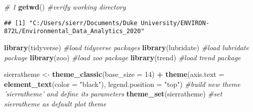 \documentclass[
]{article}
\newenvironment{Shaded}{\begin{snugshade}}{\end{snugshade}}
\newcommand{\CommentTok}[1]{\textcolor[rgb]{0.56,0.35,0.01}{\textit{#1}}}
\newcommand{\DataTypeTok}[1]{\textcolor[rgb]{0.13,0.29,0.53}{#1}}
\newcommand{\DecValTok}[1]{\textcolor[rgb]{0.00,0.00,0.81}{#1}}
\newcommand{\KeywordTok}[1]{\textcolor[rgb]{0.13,0.29,0.53}{\textbf{#1}}}
\newcommand{\NormalTok}[1]{#1}
\newcommand{\OperatorTok}[1]{\textcolor[rgb]{0.81,0.36,0.00}{\textbf{#1}}}
\newcommand{\StringTok}[1]{\textcolor[rgb]{0.31,0.60,0.02}{#1}}
\begin{document}
\begin{Shaded}
\begin{Highlighting}[]
\CommentTok{# 1 }
\KeywordTok{getwd}\NormalTok{() }\CommentTok{#verify working directory}
\end{Highlighting}
\end{Shaded}

\begin{verbatim}
## [1] "C:/Users/sierr/Documents/Duke University/ENVIRON-872L/Environmental_Data_Analytics_2020"
\end{verbatim}

\begin{Shaded}
\begin{Highlighting}[]
\KeywordTok{library}\NormalTok{(tidyverse) }\CommentTok{#load tidyverse packages}
\KeywordTok{library}\NormalTok{(lubridate) }\CommentTok{#load lubridate package}
\KeywordTok{library}\NormalTok{(zoo) }\CommentTok{#load zoo package}
\KeywordTok{library}\NormalTok{(trend) }\CommentTok{#load trend package}

\NormalTok{sierratheme <-}\StringTok{ }\KeywordTok{theme_classic}\NormalTok{(}\DataTypeTok{base_size =} \DecValTok{14}\NormalTok{) }\OperatorTok{+}
\StringTok{  }\KeywordTok{theme}\NormalTok{(}\DataTypeTok{axis.text =} \KeywordTok{element_text}\NormalTok{(}\DataTypeTok{color =} \StringTok{"black"}\NormalTok{), }
        \DataTypeTok{legend.position =} \StringTok{"top"}\NormalTok{)}
  \CommentTok{#build new theme 'sierratheme' and define its parameters}
\KeywordTok{theme_set}\NormalTok{(sierratheme) }\CommentTok{#set sierratheme as default plot theme}


\end{Highlighting}
\end{Shaded}
\end{document}
